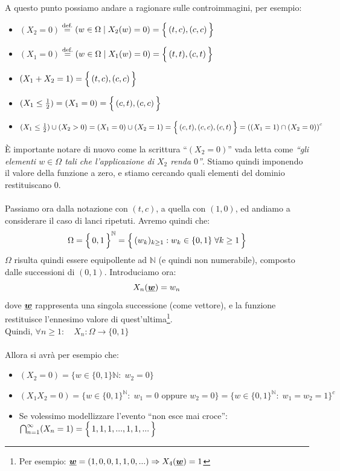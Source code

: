 \begin{esempio}
A questo punto possiamo andare a ragionare sulle controimmagini, per esempio:
\begin{itemize}
    \item \textcolor{red!70!black}{$(X_2 = 0)$}$ \:\overset{\text{def.}}{=} (w\in\Omega \mid X_2(w) = 0) = \Bigl\{\,(t, c), (c, c)\,\Bigr\}$
    \item \textcolor{blue!70!black}{$(X_1 = 0)$}$ \:\overset{\text{def.}}{=} (w\in\Omega \mid X_1(w) = 0) = \Bigl\{\,(t, t), (c, t)\,\Bigr\}$
    \item $(X_1 + X_2 = 1) = \Bigl\{\,(t, c), (c, c)\,\Bigr\}$
    \item $(X_1\leq\frac{1}{2}) = (X_1 = 0) = \Bigl\{\,(c, t), (c, c)\,\Bigr\}$
    \item $(X_1\leq\frac{1}{2}) \cup (X_2>0) = (X_1=0) \cup (X_2 = 1) = \Bigl\{\,(c, t), (c, c), (c, t)\,\Bigr\} = \left((X_1 = 1)\cap(X_2=0)\right)^c$
\end{itemize}
È importante notare di nuovo come la scrittura ``$(X_2=0)$'' vada letta come \textit{``gli elementi $w\in\Omega$ tali che l'applicazione di $X_2$ renda $0$''}. Stiamo quindi imponendo il valore della funzione a zero, e stiamo cercando quali elementi del dominio restituiscano $0$.\\
\\
Passiamo ora dalla notazione con $(t, c)$, a quella con $(1, 0)$, ed andiamo a considerare il caso di lanci ripetuti. Avremo quindi che:
\[\Omega = \Bigl\{\,0, 1\,\Bigr\}^\mathbb{N} = \Bigl\{\,(w_k)_{k\geq1}:w_k \in \{0, 1\}\;\forall k\geq1\,\Bigr\}\]
$\Omega$ risulta quindi essere equipollente ad $\mathbb{N}$ (e quindi non numerabile), composto dalle successioni di $(0, 1)$. Introduciamo ora: 
\[X_n(\underline{{\boldsymbol{w}}}) = w_n\]
dove $\underline{{\boldsymbol{w}}}$ rappresenta una singola successione (come vettore), e la funzione restituisce l'ennesimo valore di quest'ultima\footnote{Per esempio: $\underline{{\boldsymbol{w}}} = (1, 0, 0, 1, 1, 0, ...)\Rightarrow X_4(\underline{{\boldsymbol{w}}}) = 1$}. \\
Quindi, $\forall n\geq1: \quad X_n:\Omega\to\{0, 1\}$\\
\\Allora si avrà per esempio che:
\begin{itemize}
    \item $(X_2 = 0) = \{w\in\{0, 1\}\mathbb{N}: \; w_2 = 0\}$
    \item $(X_1X_2 = 0) =\{w\in\{0, 1\}^\mathbb{N}:\;w_1=0 \text{ oppure } w_2 = 0\} = \{w\in\{0, 1\}^\mathbb{N}:\; w_1=w_2=1\}^c$ 
    \item Se volessimo modellizzare l'evento ``non esce mai croce'': \\
    $\bigcap_{n=1}^\infty (X_n = 1 ) = \Bigl\{\,1, 1, 1, ..., 1, 1, ...\,\Bigr\}$
\end{itemize}
\end{esempio}